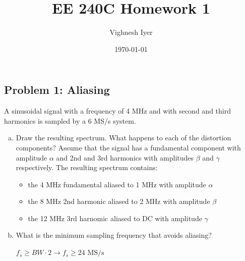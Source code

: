 \documentclass[11pt]{article}
\begin{document}
\title{EE 240C Homework 1}
\author{Vighnesh Iyer}
\date{\today}
\maketitle

\subsection*{Problem 1: Aliasing}
A sinusoidal signal with a frequency of 4 MHz and with second and third harmonics is sampled by a 6 MS/s system.
\begin{enumerate}[a)]
    \item Draw the resulting spectrum. What happens to each of the distortion components?
        Assume that the signal has a fundamental component with amplitude $\alpha$ and 2nd and 3rd harmonics with amplitudes $\beta$ and $\gamma$ respectively.
        The resulting spectrum contains:
        \begin{itemize}
            \item the 4 MHz fundamental aliased to 1 MHz with amplitude $\alpha$
            \item the 8 MHz 2nd harmonic aliased to 2 MHz with amplitude $\beta$
            \item the 12 MHz 3rd harnomic aliased to DC with amplitude $\gamma$
        \end{itemize}
    \item What is the minimum sampling frequency that avoids aliasing?

        $f_s \geq BW \cdot 2 \rightarrow f_s \geq 24 \text{ MS/s}$
\end{enumerate}
\end{document}
